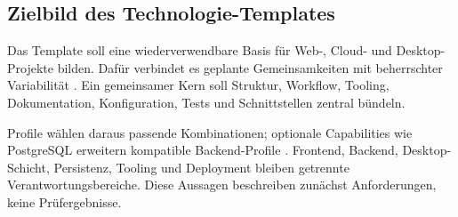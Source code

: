 \subsection{Zielbild des Technologie-Templates}
\label{subsec:zielbild-technologie-template}

Das Template soll eine wiederverwendbare Basis für Web-, Cloud- und
Desktop-Projekte bilden. Dafür verbindet es geplante Gemeinsamkeiten mit
beherrschter Variabilität
\parencite{krueger1992software-reuse,clements2001software-product-lines}.
Ein gemeinsamer Kern soll Struktur, Workflow, Tooling, Dokumentation,
Konfiguration, Tests und Schnittstellen zentral bündeln.

Profile wählen daraus passende Kombinationen; optionale Capabilities wie
PostgreSQL erweitern kompatible Backend-Profile
\parencite{kleiveist2026profiles}. Frontend, Backend, Desktop-Schicht,
Persistenz, Tooling und Deployment bleiben getrennte Verantwortungsbereiche.
Diese Aussagen beschreiben zunächst Anforderungen, keine Prüfergebnisse.

